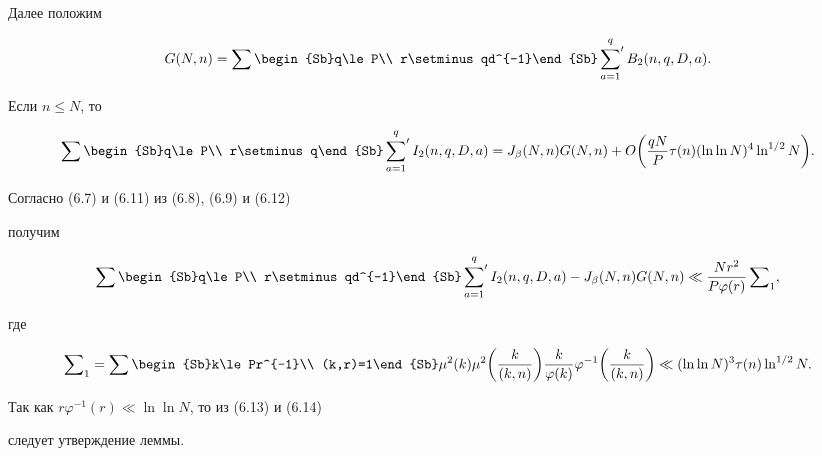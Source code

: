 Далее положим


\begin{equation}


G(N,n)=\sum\begin{Sb}q\le P\\ r\setminus qd^{-1}\end{Sb}


\sideset{}{'}\sum_{a=1}^q B_2(n,q,D,a).


\end{equation}





\begin{lems}


Если $n\le N$, то


$$


\sum\begin{Sb}q\le P\\ r\setminus q\end{Sb}


\sideset{}{'}\sum_{a=1}^q I_2(n,q,D,a)=J_\beta(N,n) G(N,n)


+O\bigg(\frac{qN}{P}\tau(n)(\ln\ln N)^4\ln^{1/2} N\bigg).


$$


\end{lems}





\begin{pf}


Согласно (6.7) и (6.11) из (6.8), (6.9) и (6.12)


получим


\begin{equation}


\sum\begin{Sb}q\le P\\ r\setminus qd^{-1}\end{Sb}


\sideset{}{'}\sum_{a=1}^q I_2(n,q,D,a)-J_\beta(N,n) G(N,n)\ll


\frac{Nr^2}{P\varphi(r)}\sum\nolimits_1,


\end{equation}


где 


\begin{equation}


\sum\nolimits_1 =\sum\begin{Sb}k\le Pr^{-1}\\ (k,r)=1\end{Sb}


\mu^2(k)\mu^2\bigg(\frac{k}{(k,n)}\bigg)


\frac{k}{\varphi(k)}\varphi^{-1}\bigg(\frac{k}{(k,n)}\bigg)\ll


(\ln\ln N)^3\tau(n)\ln^{1/2}N.


\end{equation}


Так как $r\varphi^{-1}(r)\ll\ln\ln N$, то из (6.13) и (6.14)


следует утверждение леммы.


\end{pf}





